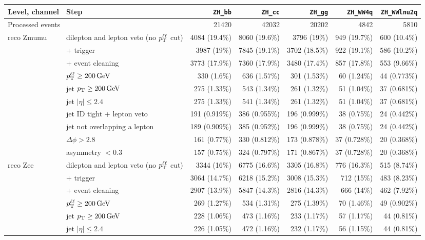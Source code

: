 \begin{tabular}{llrrrrr}
\toprule
Level, channel & Step & \texttt{ZH\_bb} & \texttt{ZH\_cc} & \texttt{ZH\_gg} & \texttt{ZH\_WW4q} & \texttt{ZH\_WWlnu2q} \\
\midrule
\multicolumn{2}{l}{Processed events} & 21420 & 42032 & 20202 & 4842 & 5810 \\
\midrule
reco Zmumu & dilepton and lepton veto (no $p_{\mathrm{T}}^{\ell\ell}$ cut) & 4084 (19.4\%) & 8060 (19.6\%) & 3796 (19\%) & 949 (19.7\%) & 600 (10.4\%) \\
 & + trigger & 3987 (19\%) & 7845 (19.1\%) & 3702 (18.5\%) & 922 (19.1\%) & 586 (10.2\%) \\
 & + event cleaning & 3773 (17.9\%) & 7360 (17.9\%) & 3480 (17.4\%) & 857 (17.8\%) & 553 (9.66\%) \\
 & $p_{\mathrm{T}}^{\ell\ell} \geq 200\,\mathrm{GeV}$ & 330 (1.6\%) & 636 (1.57\%) & 301 (1.53\%) & 60 (1.24\%) & 44 (0.773\%) \\
 & jet $p_{\mathrm{T}} \geq 200\,\mathrm{GeV}$ & 275 (1.33\%) & 543 (1.34\%) & 261 (1.32\%) & 51 (1.04\%) & 37 (0.681\%) \\
 & jet $|\eta| \leq 2.4$ & 275 (1.33\%) & 541 (1.34\%) & 261 (1.32\%) & 51 (1.04\%) & 37 (0.681\%) \\
 & jet ID tight + lepton veto & 191 (0.919\%) & 386 (0.955\%) & 196 (0.999\%) & 38 (0.75\%) & 24 (0.442\%) \\
 & jet not overlapping a lepton & 189 (0.909\%) & 385 (0.952\%) & 196 (0.999\%) & 38 (0.75\%) & 24 (0.442\%) \\
 & $\Delta\phi > 2.8$ & 161 (0.77\%) & 330 (0.812\%) & 173 (0.878\%) & 37 (0.728\%) & 20 (0.368\%) \\
 & asymmetry $< 0.3$ & 157 (0.75\%) & 324 (0.797\%) & 171 (0.867\%) & 37 (0.728\%) & 20 (0.368\%) \\
\midrule
reco Zee & dilepton and lepton veto (no $p_{\mathrm{T}}^{\ell\ell}$ cut) & 3344 (16\%) & 6775 (16.6\%) & 3305 (16.8\%) & 776 (16.3\%) & 515 (8.74\%) \\
 & + trigger & 3064 (14.7\%) & 6218 (15.2\%) & 3008 (15.3\%) & 712 (15\%) & 483 (8.23\%) \\
 & + event cleaning & 2907 (13.9\%) & 5847 (14.3\%) & 2816 (14.3\%) & 666 (14\%) & 462 (7.92\%) \\
 & $p_{\mathrm{T}}^{\ell\ell} \geq 200\,\mathrm{GeV}$ & 269 (1.27\%) & 534 (1.31\%) & 275 (1.39\%) & 70 (1.46\%) & 49 (0.902\%) \\
 & jet $p_{\mathrm{T}} \geq 200\,\mathrm{GeV}$ & 228 (1.06\%) & 473 (1.16\%) & 233 (1.17\%) & 57 (1.17\%) & 44 (0.81\%) \\
 & jet $|\eta| \leq 2.4$ & 226 (1.05\%) & 472 (1.16\%) & 232 (1.17\%) & 56 (1.15\%) & 44 (0.81\%) \\

\end{tabular}
